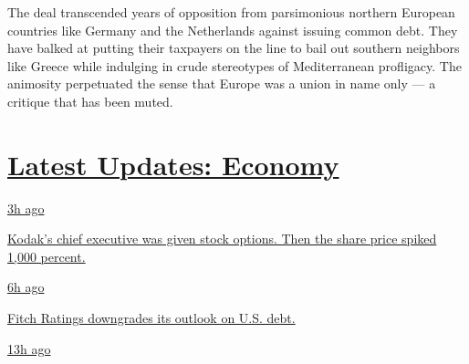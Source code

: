 The deal transcended years of opposition from parsimonious northern
European countries like Germany and the Netherlands against issuing
common debt. They have balked at putting their taxpayers on the line to
bail out southern neighbors like Greece while indulging in crude
stereotypes of Mediterranean profligacy. The animosity perpetuated the
sense that Europe was a union in name only --- a critique that has been
muted.

\hypertarget{latest-updates-economy}{%
\section{\texorpdfstring{\href{https://www.nytimes.com/live/2020/07/31/business/stock-market-today-coronavirus?action=click\&pgtype=Article\&state=default\&region=MAIN_CONTENT_1\&context=storylines_live_updates}{Latest
Updates:
Economy}}{Latest Updates: Economy}}\label{latest-updates-economy}}

\href{https://www.nytimes.com/live/2020/07/31/business/stock-market-today-coronavirus?action=click\&pgtype=Article\&state=default\&region=MAIN_CONTENT_1\&context=storylines_live_updates\#kodaks-chief-executive-was-given-stock-options-then-the-share-price-spiked-1000-percent}{3h
ago}

\href{https://www.nytimes.com/live/2020/07/31/business/stock-market-today-coronavirus?action=click\&pgtype=Article\&state=default\&region=MAIN_CONTENT_1\&context=storylines_live_updates\#kodaks-chief-executive-was-given-stock-options-then-the-share-price-spiked-1000-percent}{Kodak's
chief executive was given stock options. Then the share price spiked
1,000 percent.}

\href{https://www.nytimes.com/live/2020/07/31/business/stock-market-today-coronavirus?action=click\&pgtype=Article\&state=default\&region=MAIN_CONTENT_1\&context=storylines_live_updates\#fitch-ratings-downgrades-its-outlook-on-us-debt}{6h
ago}

\href{https://www.nytimes.com/live/2020/07/31/business/stock-market-today-coronavirus?action=click\&pgtype=Article\&state=default\&region=MAIN_CONTENT_1\&context=storylines_live_updates\#fitch-ratings-downgrades-its-outlook-on-us-debt}{Fitch
Ratings downgrades its outlook on U.S. debt.}

\href{https://www.nytimes.com/live/2020/07/31/business/stock-market-today-coronavirus?action=click\&pgtype=Article\&state=default\&region=MAIN_CONTENT_1\&context=storylines_live_updates\#us-sanctions-more-chinese-officials-over-human-rights-violations-as-tensions-flare}{13h
ago}

